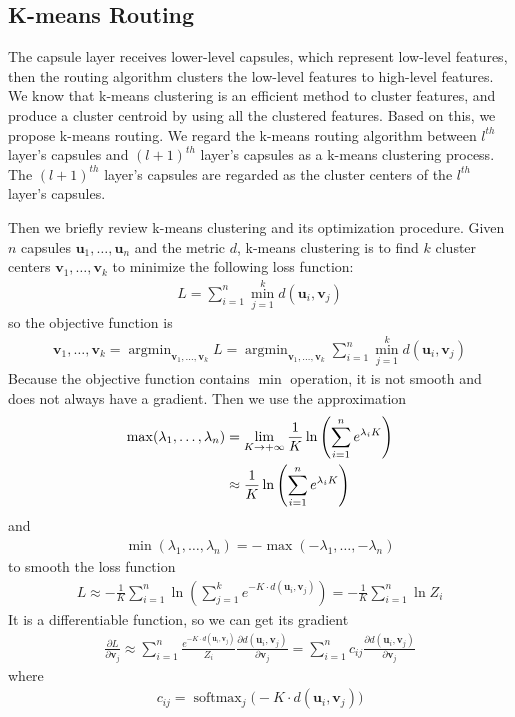 \documentclass[times,twocolumn,final]{elsarticle}
\begin{document}
\subsection{K-means Routing}
\label{sec:k_means}

The capsule layer receives lower-level capsules, which represent low-level features, then the routing algorithm clusters the low-level features to high-level features. We know that k-means clustering is an efficient method to cluster features, and produce a cluster centroid by using all the clustered features. Based on this, we propose k-means routing. We regard the k-means routing algorithm between $l^{th}$ layer's capsules and $(l+1)^{th}$ layer's capsules as a k-means clustering process. The $(l+1)^{th}$ layer's capsules are regarded as the cluster centers of the $l^{th}$ layer's capsules.

Then we briefly review k-means clustering and its optimization procedure. Given $n$ capsules $\mathbf{u}_1,\dots,\mathbf{u}_n$ and the metric $d$, k-means clustering is to find $k$ cluster centers $\mathbf{v}_1,\dots,\mathbf{v}_k$ to minimize the following loss function:
    \begin{align}
      L=\sum_{i=1}^n \min_{j=1}^k d(\mathbf{u}_i, \mathbf{v}_j)
    \end{align}
so the objective function is
    \begin{align}
      \mathbf{v}_1,\dots,\mathbf{v}_k = \mathop{\arg\min}_{\mathbf{v}_1,\dots,\mathbf{v}_k}L = \mathop{\arg\min}_{\mathbf{v}_1,\dots,\mathbf{v}_k}\sum_{i=1}^n \min_{j=1}^k d(\mathbf{u}_i, \mathbf{v}_j)
    \end{align}
Because the objective function contains $\min$ operation, it is not smooth and does not always have a gradient. Then we use the approximation~\cite{cook2011basic}
    \begin{align}
      \max(\lambda_1,\dots,\lambda_n) & = \lim_{K\to+\infty}\frac{1}{K}\ln\left(\sum_{i=1}^n e^{\lambda_i K}\right) \notag \\ & \approx \frac{1}{K}\ln\left(\sum_{i=1}^n e^{\lambda_i K}\right)
    \end{align}
and
    \begin{align}
      \min(\lambda_1,\dots,\lambda_n) = -\max(-\lambda_1,\dots,-\lambda_n)
    \end{align}
to smooth the loss function
    \begin{align}
      L\approx -\frac{1}{K}\sum_{i=1}^n \ln\left(\sum_{j=1}^k e^{-K\cdot d(\mathbf{u}_i, \mathbf{v}_j)}\right) = -\frac{1}{K}\sum_{i=1}^n\ln Z_i
    \end{align}
It is a differentiable function, so we can get its gradient
    \begin{align}
      \frac{\partial L}{\partial \mathbf{v}_j}\approx \sum_{i=1}^n \frac{e^{-K\cdot d(\mathbf{u}_i, \mathbf{v}_j)}}{Z_i} \frac{\partial d(\mathbf{u}_i, \mathbf{v}_j)}{\partial \mathbf{v}_j} = \sum_{i=1}^n c_{ij}\frac{\partial d(\mathbf{u}_i, \mathbf{v}_j)}{\partial \mathbf{v}_j}
    \end{align}
where
	\begin{align}
     c_{ij} = \mathop{softmax}_j\Big(-K\cdot d(\mathbf{u}_i, \mathbf{v}_j)\Big)
    \end{align}
\end{document}
